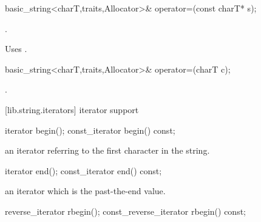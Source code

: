 %
%
\begin{itemdecl}
basic_string<charT,traits,Allocator>&
  operator=(const charT* s);
\end{itemdecl}

\begin{itemdescr}
\pnum
\returns
{}.

\pnum
\notes
Uses
%
.
\end{itemdescr}

%
%
\begin{itemdecl}
basic_string<charT,traits,Allocator>& operator=(charT c);
\end{itemdecl}

\begin{itemdescr}
\pnum
\returns
{}.
\end{itemdescr}

[lib.string.iterators]{ iterator support}

%
%
\begin{itemdecl}
iterator       begin();
const_iterator begin() const;
\end{itemdecl}

\begin{itemdescr}
\pnum
\returns
an iterator referring to the first character in the string.
\end{itemdescr}

%
%
\begin{itemdecl}
iterator       end();
const_iterator end() const;
\end{itemdecl}

\begin{itemdescr}
\pnum
\returns
an iterator which is the past-the-end value.
\end{itemdescr}

%
%
\begin{itemdecl}
reverse_iterator       rbegin();
const_reverse_iterator rbegin() const;
\end{itemdecl}

